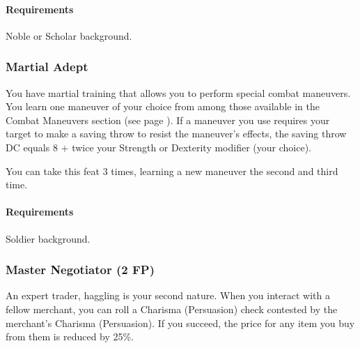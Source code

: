     \paragraph{Requirements} Noble or Scholar background.
%
\subsubsection{Martial Adept} \label{feat::martialadept}
    You have martial training that allows you to perform special combat maneuvers.
    You learn one maneuver of your choice from among those available in the Combat Maneuvers section (see page \pageref{ssec::combatmaneuvers}).
    If a maneuver you use requires your target to make a saving throw to resist the maneuver's effects, the saving throw DC equals 8 + twice your Strength or Dexterity modifier (your choice).


    You can take this feat 3 times, learning a new maneuver the second and third time.
    \paragraph{Requirements} Soldier background.
\subsubsection{Master Negotiator (2 FP)} \label{feat::masternegotiator}
    An expert trader, haggling is your second nature.
    When you interact with a fellow merchant, you can roll a Charisma (Persuasion) check contested by the merchant's Charisma (Persuasion).
    If you succeed, the price for any item you buy from them is reduced by 25\%.
